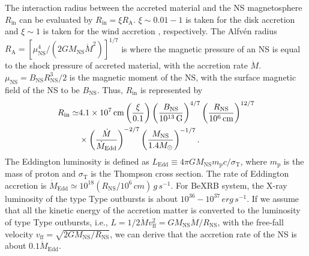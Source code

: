\documentclass[twocolumn]{aastex62}
\begin{document}
The interaction radius between the accreted material and the NS magnetosphere $R_{\text{in}}$ can be evaluated by $R_{\text{in}}=\xi R_{\text{A}}$. 
$\xi \sim 0.01-1$ is taken for the disk accretion \citep[e.g.,][]{gho79a, fil17} and $\xi \sim 1$ is taken for the wind accretion \citep[e.g.,][]{lv12}, respectively. 
The Alfv\'en radius $R_{\text{A}} = [\mu_{\text{NS}}^4/(2GM_{\text{NS}}\dot{M}^2)]^{1/7}$ is where the magnetic pressure of an NS is equal to the shock pressure of accreted material, with the accretion rate $\dot{M}$. 
$\mu_{\text{NS}} = B_{\text{NS}}R^3_{\text{NS}}/2$ is the magnetic moment of the NS, with the surface magnetic field of the NS to be $B_{\text{NS}}$.
Thus, $R_{\text{in}}$ is represented by
\begin{align}
R_{\mathrm{in}} \simeq & 4.1\times10^7 \,\unit{cm} \left( \frac{\xi}{0.1}\right) \left(\frac{B_{\text{NS}}}{10^{13}\,\unit{G}}\right)^{4/7} \left(\frac{R_{\text{NS}}}{10^6\,\unit{cm}}\right)^{12/7} \notag \\
 &\times \left(\frac{\dot{M}}{\dot{M}_{\text{Edd}}}\right)^{-2/7}\left(\frac{M_{\text{NS}}}{1.4M_{\odot}}\right)^{-1/7}.
\end{align}
The Eddington luminosity is defined as $ L_{\text{Edd}} \equiv 4\pi G  M_{\text{NS}} m_{\text{p}} c/\sigma_{\text{T}}$,
where $m_{\text{p}}$ is the mass of proton and $\sigma_{\text{T}}$ is the Thompson cross section.
The rate of Eddington accretion is
$\dot M_{\text{Edd}} \simeq 10^{18} \left(R_{\text{NS}}/10^6\,\unit{cm}\right) \,\unit{g\,s^{-1}}$.
For BeXRB system, the X-ray luminosity of the type Type \uppercase\expandafter{} outbursts is about $10^{36}-10^{37}\,\unit{erg\,s^{-1}}$. If we assume that all the kinetic energy of the accretion matter is converted to the luminosity of type Type \uppercase\expandafter{} outbursts, i.e.,
$L=1/2 \dot{M} v_{\mathrm{ff}}^{2}=G M_{\text{NS}} \dot{M}/R_{\text{NS}}$,
with the free-fall velocity $v_{\text{ff}}=\sqrt{2GM_{\text{NS}}/R_{\text{NS}}}$,
we can derive that the accretion rate of the NS is about $0.1\dot{M}_{\text{Edd}}$.
\end{document}
